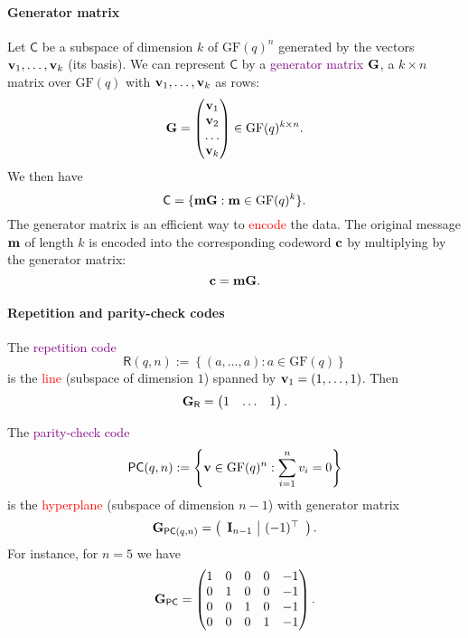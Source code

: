 \documentclass[a4paper, 11pt, openany]{book}
\numberwithin{equation}{section}
\theoremstyle{plain}
\theoremstyle{definition}
\newcommand{\GF}{\mathrm{GF}}
\newcommand{\Important}[1]{\textcolor{red}{#1}}
\newcommand{\Define}[1]{\textcolor{purple}{#1}}
\newcommand{\code}[1]{\mathsf{#1}}
\newcommand{\Paritycheck}           {\code{PC}}
\newcommand{\Repetition}            {\code{R}}
\begin{document}
\paragraph{Generator matrix}
Let $\code{C}$ be a subspace of dimension $k$ of $\GF(q)^n$ generated by the vectors ${\bf v}_1, \ldots, {\bf v}_k$ (its basis). We can represent $\code{C}$ by a \Define{generator matrix} ${\bf G}$, a $k \times n$ matrix over $\GF(q)$ with ${\bf v}_1,\ldots,{\bf v}_k$ as rows:
\[
    {\bf G} = \begin{pmatrix}
    {\bf v}_1\\
    {\bf v}_2\\
    \dots\\
    {\bf v}_k
    \end{pmatrix} \in \GF(q)^{k \times n}.
\]
We then have 
\[
	\code{C} = \{{\bf m}{\bf G}: {\bf m} \in \GF(q)^k\}.
\]
The generator matrix is  an efficient way to \Important{encode} the data. The original message ${\bf m}$ of length $k$ is encoded into the corresponding codeword ${\bf c}$ by multiplying by the generator matrix:
\[
    {\bf c} = {\bf m}{\bf G}.
\]

\paragraph{Repetition and parity-check codes}
The \Define{repetition code} 
\[
    \Repetition(q,n) :=  \left\{ (a,\dots,a) : a \in \GF(q) \right\} 
\]
is the \Important{line} (subspace of dimension $1$) spanned by ${\bf v}_1 = (1,\ldots,1)$. Then
\[
	{\bf G}_{\Repetition} = \begin{pmatrix} 1 & \ldots & 1 \end{pmatrix}.
\]


The \Define{parity-check code} 
\[
    \Paritycheck(q,n) := \left\{ {\bf v} \in \GF(q)^n : \sum_{i=1}^n v_i = 0 \right\}
\]
is the \Important{hyperplane} (subspace of dimension $n-1$) with generator matrix
\[
    {\bf G}_{\Paritycheck(q,n)} = \left( \begin{array}{c|c}
    {\bf I}_{n-1} & (-1)^\top
    \end{array}\right).
\]
For instance, for $n=5$ we have
\[
	{\bf G}_{\Paritycheck} = \begin{pmatrix}
	 1 & 0 & 0 & 0 & -1\\
	 0 & 1 & 0 & 0 & -1\\
	0 & 0 & 1 & 0 & -1\\ 
	0 & 0 & 0 & 1 & -1
	\end{pmatrix}.
\]
\end{document}
